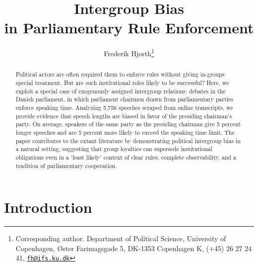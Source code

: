 \documentclass[12pt,a4paper]{article}
\title{ \textbf{Intergroup Bias \\ in Parliamentary Rule Enforcement}  }
\author{Frederik Hjorth\thanks{Corresponding author. Department of Political Science, University of Copenhagen, Øster Farimagsgade 5, DK-1353 Copenhagen K, (+45) 26 27 24 41, \texttt{\href{mailto:fh@ifs.ku.dk}{fh@ifs.ku.dk}}}}
\date{}
\begin{document}
\maketitle




\doublespacing

\clearpage
\begin{abstract}
\noindent Political actors are often required them to enforce rules without giving in-groups special treatment. But are such institutional roles likely to be successful? Here, we exploit a special case of exogenously assigned intergroup relations: debates in the Danish parliament, in which parliament chairmen drawn from parliamentary parties enforce speaking time. Analyzing 5,756 speeches scraped from online transcripts, we provide evidence that speech lengths are biased in favor of the presiding chairman's party. On average, speakers of the same party as the presiding chairman give 5 percent longer speeches and are 5 percent more likely to exceed the speaking time limit. The paper contributes to the extant literature by demonstrating political intergroup bias in a natural setting, suggesting that group loyalties can supersede institutional obligations even in a `least likely' context of clear rules, complete observability, and a tradition of parliamentary cooperation.
\end{abstract}




\newpage

\section{Introduction}
\end{document}
